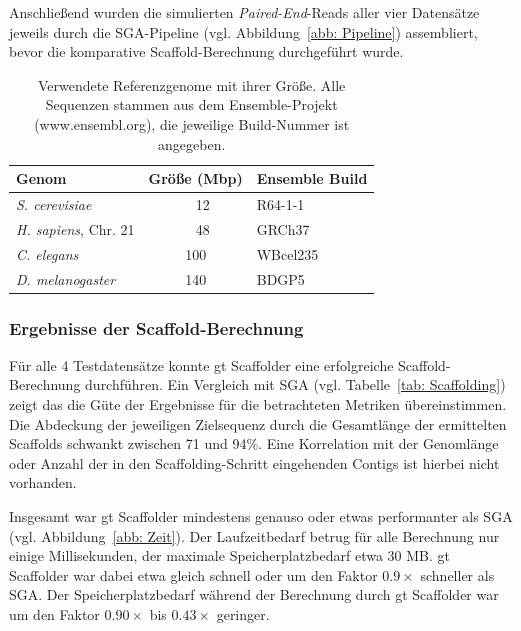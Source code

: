 \documentclass[a4paper,11pt,parskip,abstract=on]{scrartcl}
\begin{document}
Anschließend wurden die simulierten \textit{Paired-End}-Reads aller vier
Datensätze jeweils durch die SGA-Pipeline (vgl. Abbildung~\ref{abb: Pipeline})
assembliert, bevor die komparative Scaffold-Berechnung durchgeführt wurde.

\begin{table}
  \centering
  \begin{tabular}{lcl}
    Genom & Größe (Mbp) & Ensemble Build \\
    \hline
    \textit{S. cerevisiae} &~~12 & R64-1-1 \\
    \textit{H. sapiens}, Chr. 21 &~~48 & GRCh37 \\
    \textit{C. elegans} & 100 & WBcel235 \\
    \textit{D. melanogaster} & 140 & BDGP5
  \end{tabular}
  \caption{\label{tab: Referenzgenome}Verwendete Referenzgenome mit ihrer
  Größe. Alle Sequenzen stammen aus dem Ensemble-Projekt (www.ensembl.org),
  die jeweilige Build-Nummer ist angegeben.}
\end{table}

\subsubsection*{Ergebnisse der Scaffold-Berechnung}

Für alle 4 Testdatensätze konnte gt Scaffolder eine erfolgreiche
Scaffold-Berechnung durchführen. Ein Vergleich mit SGA (vgl.
Tabelle~\ref{tab: Scaffolding}) zeigt das die Güte der Ergebnisse für die
betrachteten Metriken übereinstimmen. Die Abdeckung der
jeweiligen Zielsequenz durch die Gesamtlänge der ermittelten Scaffolds
schwankt zwischen 71 und 94\%. Eine Korrelation mit der Genomlänge
oder Anzahl der in den Scaffolding-Schritt eingehenden Contigs ist
hierbei nicht vorhanden.

Insgesamt war gt Scaffolder mindestens genauso oder etwas performanter als
SGA (vgl. Abbildung~\ref{abb: Zeit}). Der Laufzeitbedarf betrug für alle
Berechnung nur einige Millisekunden, der maximale Speicherplatzbedarf etwa 30
MB. gt
Scaffolder war dabei etwa gleich schnell oder um den Faktor $0.9\times$
schneller als SGA. Der Speicherplatzbedarf während der Berechnung durch gt
Scaffolder war um den Faktor $0.90\times$ bis $0.43\times$ geringer.
\end{document}
